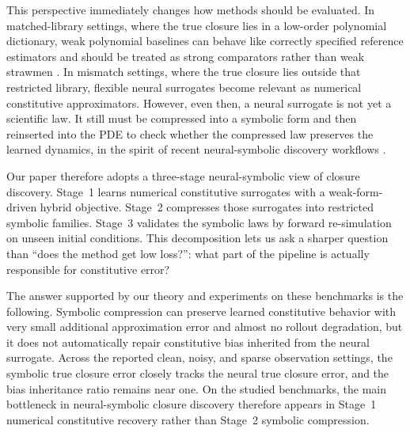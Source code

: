 \documentclass[preprint,12pt]{elsarticle}
\begin{document}
This perspective immediately changes how methods should be evaluated. In matched-library settings, where the true closure lies in a low-order polynomial dictionary, weak polynomial baselines can behave like correctly specified reference estimators and should be treated as strong comparators rather than weak strawmen \cite{Brunton_2016,Rudy_2017}. In mismatch settings, where the true closure lies outside that restricted library, flexible neural surrogates become relevant as numerical constitutive approximators. However, even then, a neural surrogate is not yet a scientific law. It still must be compressed into a symbolic form and then reinserted into the PDE to check whether the compressed law preserves the learned dynamics, in the spirit of recent neural-symbolic discovery workflows \cite{Long_2019,Cranmer_2020,Udrescu_2020,Biggio_2021}.

Our paper therefore adopts a three-stage neural-symbolic view of closure discovery. Stage~1 learns numerical constitutive surrogates with a weak-form-driven hybrid objective. Stage~2 compresses those surrogates into restricted symbolic families. Stage~3 validates the symbolic laws by forward re-simulation on unseen initial conditions. This decomposition lets us ask a sharper question than ``does the method get low loss?'': what part of the pipeline is actually responsible for constitutive error?

The answer supported by our theory and experiments on these benchmarks is the following. Symbolic compression can preserve learned constitutive behavior with very small additional approximation error and almost no rollout degradation, but it does not automatically repair constitutive bias inherited from the neural surrogate. Across the reported clean, noisy, and sparse observation settings, the symbolic true closure error closely tracks the neural true closure error, and the bias inheritance ratio remains near one. On the studied benchmarks, the main bottleneck in neural-symbolic closure discovery therefore appears in Stage~1 numerical constitutive recovery rather than Stage~2 symbolic compression.
\end{document}
